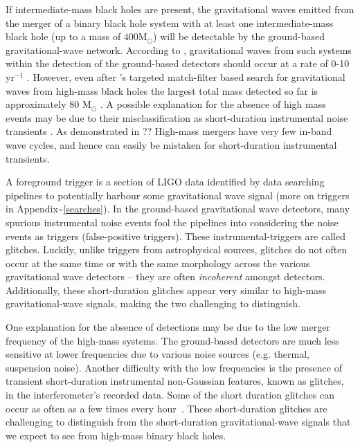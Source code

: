 \documentclass[%
 reprint,
 amsmath,amssymb,
 aps,
]{revtex4}
\begin{document}
If intermediate-mass black holes are present, the gravitational waves emitted from the merger of a binary black hole system with at least one intermediate-mass black hole (up to a mass of $400 \text{M}_\odot$) will be detectable by the ground-based gravitational-wave network. According to \citet{fregeau2006imbhbRatePrediction, mandel2008rates,rodriguez2015bbhRatePredictions}, gravitational waves from such systems within the detection of the ground-based detectors should occur at a rate of 0-10 yr\(^{-1}\) .  However, even after \citet{salemi2019search}'s
targeted match-filter based search for gravitational waves from high-mass black holes the largest total mass detected so
far is approximately 80 M\({}_\odot\) \citep{abbott2019gwtc}. A possible explanation for the absence of high mass events may be
due to their misclassification as short-duration instrumental noise transients \citep{blipGlitches}. As demonstrated in ?? High-mass mergers have
very few in-band wave cycles, and hence can easily be mistaken for short-duration instrumental transients.




A foreground trigger is a section of LIGO data identified by data searching pipelines to potentially harbour some
gravitational wave signal (more on triggers in Appendix\textasciitilde\ref{searches}). In the ground-based gravitational wave
detectors, many spurious instrumental noise events fool the pipelines into considering the noise events as triggers
(false-positive triggers). These instrumental-triggers are called glitches. Luckily, unlike triggers from astrophysical
sources, glitches do not often occur at the same time or with the same morphology across the various gravitational wave
detectors -- they are often \emph{incoherent} amongst detectors. Additionally, these short-duration glitches appear very
similar to high-mass gravitational-wave signals, making the two challenging to distinguish.


One explanation for the absence of detections may be due to the low merger frequency of the high-mass systems. The ground-based detectors are much less sensitive at lower frequencies due to various noise sources (e.g. thermal, suspension noise). Another difficulty with the low frequencies is the presence of transient short-duration instrumental non-Gaussian features, known as glitches, in the interferometer's recorded data. Some of the short duration glitches can occur as often as a few times every hour~\cite{blipGlitches}. These short-duration glitches are challenging to distinguish from the short-duration gravitational-wave signals that we expect to see from high-mass binary black holes. 
\end{document}
